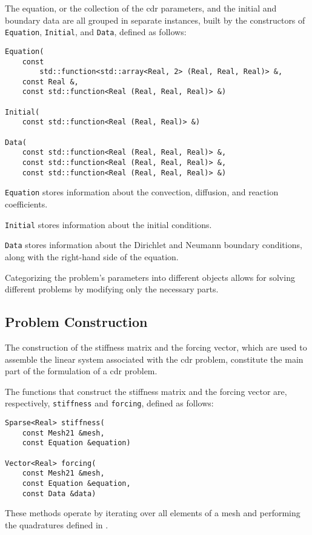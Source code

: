 The equation, or the collection of the \acrshort{cdr} parameters, and the initial and boundary data are all grouped in separate instances, built by the constructors of \lstinline{Equation}, \lstinline{Initial}, and \lstinline{Data}, defined as follows:
\begin{lstlisting}[style=cpp]
Equation(
    const 
        std::function<std::array<Real, 2> (Real, Real, Real)> &, 
    const Real &, 
    const std::function<Real (Real, Real, Real)> &)

Initial(
    const std::function<Real (Real, Real)> &)

Data(
    const std::function<Real (Real, Real, Real)> &, 
    const std::function<Real (Real, Real, Real)> &, 
    const std::function<Real (Real, Real, Real)> &)
\end{lstlisting}

\lstinline{Equation} stores information about the convection, diffusion, and reaction coefficients.

\lstinline{Initial} stores information about the initial conditions.

\lstinline{Data} stores information about the Dirichlet and Neumann boundary conditions, along with the right-hand side of the equation.

Categorizing the problem's parameters into different objects allows for solving different problems by modifying only the necessary parts.

\newpage
\subsection{Problem Construction}

The construction of the stiffness matrix and the forcing vector, which are used to assemble the linear system associated with the \acrshort{cdr} problem, constitute the main part of the formulation of a \acrshort{cdr} problem.

The functions that construct the stiffness matrix and the forcing vector are, respectively, \lstinline{stiffness} and \lstinline{forcing}, defined as follows:
\begin{lstlisting}[style=cpp]
Sparse<Real> stiffness(
    const Mesh21 &mesh, 
    const Equation &equation)

Vector<Real> forcing(
    const Mesh21 &mesh, 
    const Equation &equation, 
    const Data &data)
\end{lstlisting}
These methods operate by iterating over all elements of a mesh and performing the quadratures defined in .

